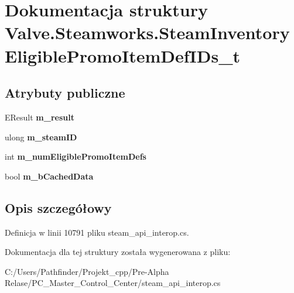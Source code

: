 \hypertarget{struct_valve_1_1_steamworks_1_1_steam_inventory_eligible_promo_item_def_i_ds__t}{}\section{Dokumentacja struktury Valve.\+Steamworks.\+Steam\+Inventory\+Eligible\+Promo\+Item\+Def\+I\+Ds\+\_\+t}
\label{struct_valve_1_1_steamworks_1_1_steam_inventory_eligible_promo_item_def_i_ds__t}
\subsection*{Atrybuty publiczne}
\begin{DoxyCompactItemize}
\item 
\mbox{\label{struct_valve_1_1_steamworks_1_1_steam_inventory_eligible_promo_item_def_i_ds__t_a5bcf0e499f6fc574a6c41f28f7c9cf1c}} 
E\+Result {\bfseries m\+\_\+result}
\item 
\mbox{\label{struct_valve_1_1_steamworks_1_1_steam_inventory_eligible_promo_item_def_i_ds__t_a897ce4a366934c41b8c86016f44f42f7}} 
ulong {\bfseries m\+\_\+steam\+ID}
\item 
\mbox{\label{struct_valve_1_1_steamworks_1_1_steam_inventory_eligible_promo_item_def_i_ds__t_a0bd8b775893016b4316ba92cc5fa900d}} 
int {\bfseries m\+\_\+num\+Eligible\+Promo\+Item\+Defs}
\item 
\mbox{\label{struct_valve_1_1_steamworks_1_1_steam_inventory_eligible_promo_item_def_i_ds__t_ac04c924d0422bae172a330decf77f97d}} 
bool {\bfseries m\+\_\+b\+Cached\+Data}
\end{DoxyCompactItemize}


\subsection{Opis szczegółowy}


Definicja w linii 10791 pliku steam\+\_\+api\+\_\+interop.\+cs.



Dokumentacja dla tej struktury została wygenerowana z pliku\+:\begin{DoxyCompactItemize}
\item 
C\+:/\+Users/\+Pathfinder/\+Projekt\+\_\+cpp/\+Pre-\/\+Alpha Relase/\+P\+C\+\_\+\+Master\+\_\+\+Control\+\_\+\+Center/steam\+\_\+api\+\_\+interop.\+cs\end{DoxyCompactItemize}
